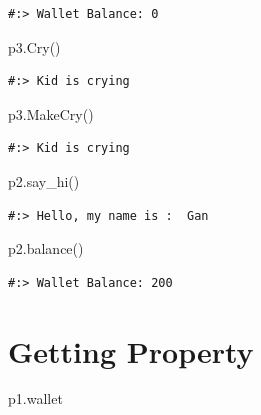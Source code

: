 \documentclass[
]{book}
\newenvironment{Shaded}{\begin{snugshade}}{\end{snugshade}}
\newcommand{\NormalTok}[1]{#1}
\begin{document}
\begin{verbatim}
#:> Wallet Balance: 0
\end{verbatim}

\begin{Shaded}
\begin{Highlighting}[]
\NormalTok{p3.Cry()}
\end{Highlighting}
\end{Shaded}

\begin{verbatim}
#:> Kid is crying
\end{verbatim}

\begin{Shaded}
\begin{Highlighting}[]
\NormalTok{p3.MakeCry()}
\end{Highlighting}
\end{Shaded}

\begin{verbatim}
#:> Kid is crying
\end{verbatim}

\begin{Shaded}
\begin{Highlighting}[]
\NormalTok{p2.say_hi()}
\end{Highlighting}
\end{Shaded}

\begin{verbatim}
#:> Hello, my name is :  Gan
\end{verbatim}

\begin{Shaded}
\begin{Highlighting}[]
\NormalTok{p2.balance()}
\end{Highlighting}
\end{Shaded}

\begin{verbatim}
#:> Wallet Balance: 200
\end{verbatim}

\hypertarget{getting-property}{%
\section{Getting Property}\label{getting-property}}

\begin{Shaded}
\begin{Highlighting}[]
\NormalTok{p1.wallet}
\end{Highlighting}
\end{Shaded}
\end{document}

